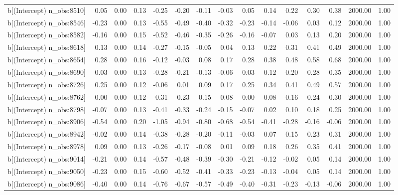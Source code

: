\begin{table}[ht]
\begin{tabular}{rrrrrrrrrrrrrrr}
  b[(Intercept) n\_obs:8510] & 0.05 & 0.00 & 0.13 & -0.25 & -0.20 & -0.11 & -0.03 & 0.05 & 0.14 & 0.22 & 0.30 & 0.38 & 2000.00 & 1.00 \\ 
  b[(Intercept) n\_obs:8546] & -0.23 & 0.00 & 0.13 & -0.55 & -0.49 & -0.40 & -0.32 & -0.23 & -0.14 & -0.06 & 0.03 & 0.12 & 2000.00 & 1.00 \\ 
  b[(Intercept) n\_obs:8582] & -0.16 & 0.00 & 0.15 & -0.52 & -0.46 & -0.35 & -0.26 & -0.16 & -0.07 & 0.03 & 0.13 & 0.20 & 2000.00 & 1.00 \\ 
  b[(Intercept) n\_obs:8618] & 0.13 & 0.00 & 0.14 & -0.27 & -0.15 & -0.05 & 0.04 & 0.13 & 0.22 & 0.31 & 0.41 & 0.49 & 2000.00 & 1.00 \\ 
  b[(Intercept) n\_obs:8654] & 0.28 & 0.00 & 0.16 & -0.12 & -0.03 & 0.08 & 0.17 & 0.28 & 0.38 & 0.48 & 0.58 & 0.68 & 2000.00 & 1.00 \\ 
  b[(Intercept) n\_obs:8690] & 0.03 & 0.00 & 0.13 & -0.28 & -0.21 & -0.13 & -0.06 & 0.03 & 0.12 & 0.20 & 0.28 & 0.35 & 2000.00 & 1.00 \\ 
  b[(Intercept) n\_obs:8726] & 0.25 & 0.00 & 0.12 & -0.06 & 0.01 & 0.09 & 0.17 & 0.25 & 0.34 & 0.41 & 0.49 & 0.57 & 2000.00 & 1.00 \\ 
  b[(Intercept) n\_obs:8762] & 0.00 & 0.00 & 0.12 & -0.31 & -0.23 & -0.15 & -0.08 & 0.00 & 0.08 & 0.16 & 0.24 & 0.30 & 2000.00 & 1.00 \\ 
  b[(Intercept) n\_obs:8798] & -0.07 & 0.00 & 0.13 & -0.41 & -0.33 & -0.24 & -0.15 & -0.07 & 0.02 & 0.10 & 0.18 & 0.25 & 2000.00 & 1.00 \\ 
  b[(Intercept) n\_obs:8906] & -0.54 & 0.00 & 0.20 & -1.05 & -0.94 & -0.80 & -0.68 & -0.54 & -0.41 & -0.28 & -0.16 & -0.06 & 2000.00 & 1.00 \\ 
  b[(Intercept) n\_obs:8942] & -0.02 & 0.00 & 0.14 & -0.38 & -0.28 & -0.20 & -0.11 & -0.03 & 0.07 & 0.15 & 0.23 & 0.31 & 2000.00 & 1.00 \\ 
  b[(Intercept) n\_obs:8978] & 0.09 & 0.00 & 0.13 & -0.26 & -0.17 & -0.08 & 0.01 & 0.09 & 0.18 & 0.26 & 0.35 & 0.41 & 2000.00 & 1.00 \\ 
  b[(Intercept) n\_obs:9014] & -0.21 & 0.00 & 0.14 & -0.57 & -0.48 & -0.39 & -0.30 & -0.21 & -0.12 & -0.02 & 0.05 & 0.14 & 2000.00 & 1.00 \\ 
  b[(Intercept) n\_obs:9050] & -0.23 & 0.00 & 0.15 & -0.60 & -0.52 & -0.41 & -0.33 & -0.23 & -0.13 & -0.04 & 0.05 & 0.14 & 2000.00 & 1.00 \\ 
  b[(Intercept) n\_obs:9086] & -0.40 & 0.00 & 0.14 & -0.76 & -0.67 & -0.57 & -0.49 & -0.40 & -0.31 & -0.23 & -0.13 & -0.06 & 2000.00 & 1.00 \\ 

\end{tabular}
\end{table}
